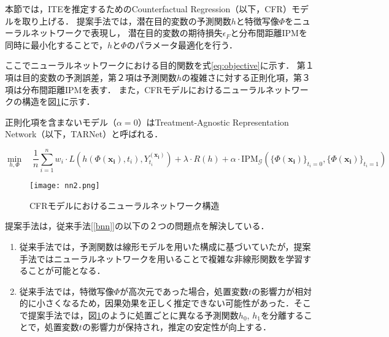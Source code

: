 \documentclass[dvipdfmx]{jreport}
\begin{document}
本節では，ITEを推定するためのCounterfactual Regression（以下，CFR）モデルを取り上げる．
提案手法では，潜在目的変数の予測関数$h$と特徴写像$\Phi$をニューラルネットワークで表現し，
潜在目的変数の期待損失$\epsilon_F$と分布間距離IPMを同時に最小化することで，$h$と$\Phi$のパラメータ最適化を行う．

ここでニューラルネットワークにおける目的関数を式\eqref{eq:objective}に示す．
第１項は目的変数の予測誤差，第２項は予測関数$h$の複雑さに対する正則化項，第３項は分布間距離IPMを表す．
また，CFRモデルにおけるニューラルネットワークの構造を図\ref{fig:nn}に示す．

正則化項を含まないモデル（$\alpha = 0$）はTreatment-Agnostic Representation Network（以下，TARNet）と呼ばれる．

\begin{equation}
    \min_{h, \Phi} \quad
    \frac{1}{n} \sum_{i=1}^{n} w_i \cdot L \left( h(\Phi(\boldsymbol{x_i}), t_i), Y_{t_i}^{(\boldsymbol{x_i})} \right) 
    + \lambda \cdot R(h)
    + \alpha \cdot \mathrm{IPM}_{\mathcal{G}} 
    \left( 
    \{ \Phi(\boldsymbol{x_i}) \}_{t_i = 0}, \{ \Phi(\boldsymbol{x_i}) \}_{t_i = 1}
    \right) \label{eq:objective}
\end{equation}

\begin{figure}[h]
    \begin{center}
        \texttt{[image: nn2.png]}
    \end{center}
    \caption{CFRモデルにおけるニューラルネットワーク構造} \label{fig:nn}
\end{figure}

提案手法は，従来手法[\ref{bnn}]の以下の２つの問題点を解決している．
\begin{tcolorbox}[title=\textbf{提案手法で解決した問題点}]
    \begin{enumerate}
        \item 従来手法では，予測関数は線形モデルを用いた構成に基づいていたが，提案手法ではニューラルネットワークを用いることで複雑な非線形関数を学習することが可能となる．
        \item 従来手法では，特徴写像$\Phi$が高次元であった場合，処置変数$t$の影響力が相対的に小さくなるため，因果効果を正しく推定できない可能性があった．そこで提案手法では，図\ref{fig:nn}のように処置ごとに異なる予測関数$h_0$, $h_1$を分離することで，処置変数$t$の影響力が保持され，推定の安定性が向上する．
    \end{enumerate}
\end{tcolorbox}
\end{document}
